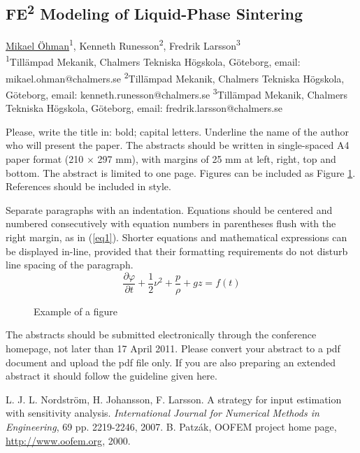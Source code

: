 \documentclass{article}
\begin{document}
\begin{center}
\section*{FE\textsuperscript{2} Modeling of Liquid-Phase Sintering}
%
\begin{minipage}[t]{\textwidth}
\centering
\underline{Mikael Öhman}\textsuperscript{1}, Kenneth Runesson\textsuperscript{2},  Fredrik Larsson\textsuperscript{3}\\
\vspace{0.5cm}
\textsuperscript{1}Tillämpad Mekanik, Chalmers Tekniska Högskola, Göteborg, email: mikael.ohman@chalmers.se
\textsuperscript{2}Tillämpad Mekanik, Chalmers Tekniska Högskola, Göteborg, email: kenneth.runesson@chalmers.se
\textsuperscript{3}Tillämpad Mekanik, Chalmers Tekniska Högskola, Göteborg, email: fredrik.larsson@chalmers.se
\end{minipage}
\end{center}

\large
Please, write the title in: bold; capital letters. Underline the name of the author who will present the paper. The abstracts should be written in single-spaced A4 paper format (210 $\times$ 297 mm), with margins of 25 mm at left, right, top and bottom. The abstract is limited to one page. Figures can be included as Figure \ref{Figure1}. References should be included in \cite{Lars} style.

Separate paragraphs with an indentation. Equations should be centered and numbered consecutively with equation numbers in parentheses flush with the right margin, as in (\ref{eq1}). Shorter equations and mathematical expressions can be displayed in-line, provided that their formatting requirements do not disturb line spacing of the paragraph.
%
\begin{equation}\label{eq1}
\frac{\partial{\varphi}}{\partial{t}}+\frac{1}{2}\nu^2+\frac{p}{\rho}+gz=f(t)
\end{equation}
%
\begin{figure}[htb]
\begin{center}
\begin{minipage}[t]{.45\textwidth}
\caption{\footnotesize Example of a figure} \label{Figure1}
\end{minipage}
\end{center}
\end{figure}

The abstracts should be submitted electronically through the conference homepage, not later than 17 April 2011. Please convert your abstract to a pdf document and upload the pdf file only.
If you are also preparing an extended abstract it should follow the guideline given here.
\begin{thebibliography}{00}
\normalsize
   L. J. L. Nordström, H. Johansson, F. Larsson. A strategy for input estimation
   with sensitivity analysis. \emph{International Journal for Numerical Methods in Engineering}, 69 pp. 2219-2246, 2007.
  B. Patzák, OOFEM project home page, \url{http://www.oofem.org}, 2000.
\end{thebibliography}
\end{document}
